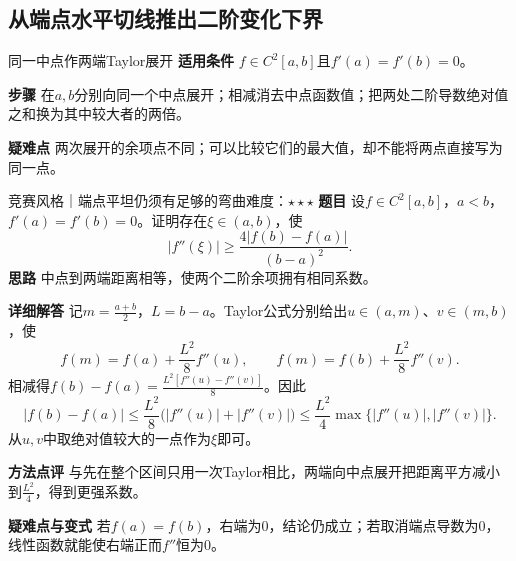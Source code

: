 \subsection{从端点水平切线推出二阶变化下界}
\begin{method}{同一中点作两端Taylor展开}
\textbf{适用条件} $f\in C^2[a,b]$且$f'(a)=f'(b)=0$。\par
\textbf{步骤} 在$a,b$分别向同一个中点展开；相减消去中点函数值；把两处二阶导数绝对值之和换为其中较大者的两倍。\par
\textbf{疑难点} 两次展开的余项点不同；可以比较它们的最大值，却不能将两点直接写为同一点。
\end{method}
\begin{example}{竞赛风格｜端点平坦仍须有足够的弯曲}{难度：$\star\star\star$}\label{cd:ex:endpoint-bound}
\textbf{题目} 设$f\in C^2[a,b]$，$a<b$，$f'(a)=f'(b)=0$。证明存在$\xi\in(a,b)$，使
\[
 |f''(\xi)|\ge\dfrac{4|f(b)-f(a)|}{(b-a)^2}.
\]
\textbf{思路} 中点到两端距离相等，使两个二阶余项拥有相同系数。\par
\textbf{详细解答} 记$m=\frac{a+b}{2}$，$L=b-a$。Taylor公式分别给出$u\in(a,m)$、$v\in(m,b)$，使
\[
 f(m)=f(a)+\dfrac{L^2}{8}f''(u),\qquad
 f(m)=f(b)+\dfrac{L^2}{8}f''(v).
\]
相减得$f(b)-f(a)=\frac{L^2[f''(u)-f''(v)]}{8}$。因此
\[
 |f(b)-f(a)|
 \le\dfrac{L^2}{8}\bigl(|f''(u)|+|f''(v)|\bigr)
 \le\dfrac{L^2}{4}\max\{|f''(u)|,|f''(v)|\}.
\]
从$u,v$中取绝对值较大的一点作为$\xi$即可。\par
\textbf{方法点评} 与先在整个区间只用一次Taylor相比，两端向中点展开把距离平方减小到$\frac{L^2}{4}$，得到更强系数。\par
\textbf{疑难点与变式} 若$f(a)=f(b)$，右端为0，结论仍成立；若取消端点导数为0，线性函数就能使右端正而$f''$恒为0。
\end{example}

